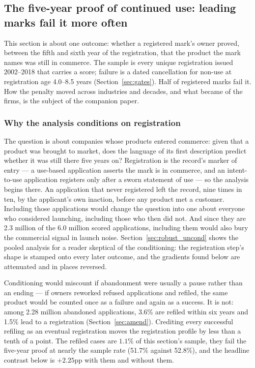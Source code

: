 \subsection{The five-year proof of continued use: leading marks fail it more often}\label{sec:gate}\label{sec:val_gate}

This section is about one outcome: whether a registered mark's owner
proved, between the fifth and sixth year of the registration, that the
product the mark names was still in commerce. The sample is every unique
registration issued 2002--2018 that carries a score; failure is a dated
cancellation for non-use at registration age 4.0--8.5 years
(Section~\ref{sec:gates}). Half of registered marks fail it. How the
penalty moved across industries and decades, and what became of the
firms, is the subject of the companion paper.

\subsubsection{Why the analysis conditions on registration}\label{sec:filter}

The question is about companies whose products entered commerce: given
that a product was brought to market, does the language of its first
description predict whether it was still there five years on? Registration
is the record's marker of entry --- a use-based application asserts the
mark is in commerce, and an intent-to-use application registers only after
a sworn statement of use --- so the analysis begins there. An application
that never registered left the record, nine times in ten, by the
applicant's own inaction, before any product met a customer. Including
those applications would change the question into one about everyone who
considered launching, including those who then did not. And since they
are 2.3 million of the 6.0 million scored applications, including them
would also bury the commercial signal in launch noise.
Section~\ref{sec:robust_uncond} shows the pooled analysis for a reader
skeptical of the conditioning: the registration step's shape is stamped
onto every later outcome, and the gradients found below are attenuated and
in places reversed.

Conditioning would miscount if abandonment were usually a pause rather
than an ending --- if owners reworked refused applications and refiled,
the same product would be counted once as a failure and again as a
success. It is not: among 2.28 million abandoned applications, 3.6\% are
refiled within six years and 1.5\% lead to a registration
(Section~\ref{sec:amend}). Crediting every successful refiling as an
eventual registration moves the registration profile by less than a tenth
of a point. The refiled cases are $1.1$\% of this section's sample, they
fail the five-year proof at nearly the sample rate (51.7\% against
52.8\%), and the headline contrast below is $+2.25$pp with them and
without them.

